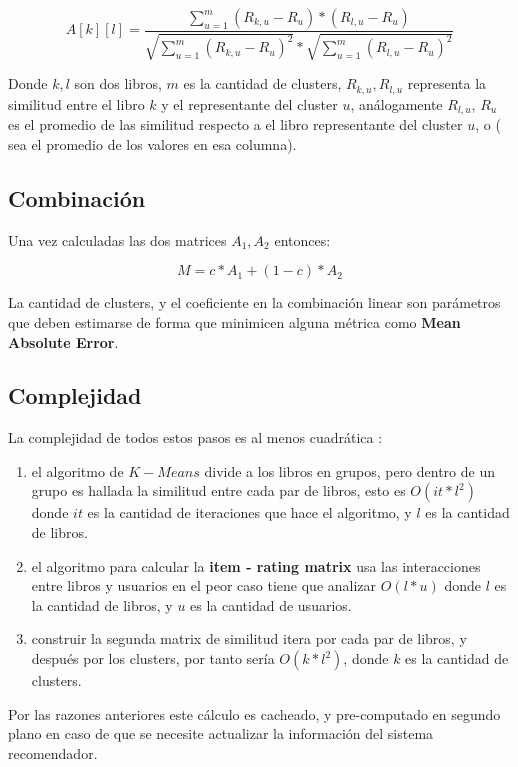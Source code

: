\documentclass[14pt]{extarticle}
\begin{document}
$$A[k][l] = \frac{ \sum_{u = 1}^m (R_{k, u} - R_u)*(R_{l, u} - R_u) }{ \sqrt{\sum_{u = 1}^m (R_{k, u} - R_u)^2} * \sqrt{\sum_{u = 1}^m (R_{l, u} - R_u)^2} }$$

Donde $k, l$ son dos libros, $m$ es la cantidad de clusters, $R_{k,u}, R_{l,u}$ representa la similitud entre el libro $k$ y el representante del cluster $u$, análogamente $R_{l, u}$, $R_u$ es el promedio de las similitud respecto a el libro representante del cluster $u$, o ( sea el promedio de los valores en esa columna).

\subsection{Combinación}

Una vez calculadas las dos matrices $A_1, A_2$ entonces:

$$M = c * A_1 + (1-c) * A_2$$

La cantidad de clusters, y el coeficiente en la combinación linear son parámetros que deben estimarse de forma que minimicen alguna métrica como \textbf{Mean Absolute Error}.

\subsection{Complejidad}

La complejidad de todos estos pasos es al menos cuadrática : 

\begin{enumerate}
    \item el algoritmo de $K-Means$ divide a los libros en grupos, pero dentro de un  grupo es hallada la similitud entre cada par de libros, esto es $O(it * l^2)$ donde $it$ es la cantidad de iteraciones que hace el algoritmo, y $l$ es la cantidad de libros.

    \item el algoritmo para calcular la \textbf{item - rating matrix} usa las interacciones entre libros y usuarios en el peor caso tiene que analizar $O(l * u)$ donde $l$ es la cantidad de libros, y $u$ es la cantidad de usuarios.
    
    \item construir la segunda matrix de similitud itera por cada par de libros, y después por los clusters, por tanto sería $O( k * l^2)$, donde $k$ es la cantidad de clusters.
\end{enumerate}
     
Por las razones anteriores este cálculo es cacheado, y pre-computado en segundo plano en caso de que se necesite actualizar la información del sistema recomendador.
\end{document}
